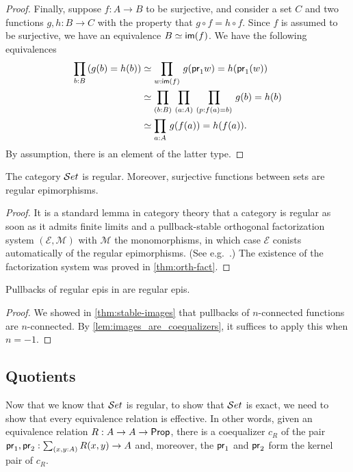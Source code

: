 \begin{proof}
Finally, suppose $f:A\to B$ to be surjective, and consider a set $C$ and two functions
$g,h:B\to C$ with the property that $g\circ f = h\circ f$. Since $f$ 
is assumed to be surjective,
we have an equivalence $B\simeq\mathsf{im}(f)$. We have the following equivalences
\begin{align*}
\prd{b:B} (g(b)= h(b))
& \simeq \prd{w:\im(f)} g(\proj1 w)= h(\proj1(w))\\
& \simeq \prd{b:B}{a:A}{p:f(a)= b} g(b)= h(b)\\
& \simeq \prd{a:A} g(f(a))= h(f(a)).
\end{align*}
By assumption, there is an element of the latter type.
\end{proof}


\begin{thm}\label{thm:set_regular}\label{lem:images_are_coequalizers}
The category $\mathcal{S}et$ is regular. Moreover, surjective functions between sets are regular epimorphisms.
\end{thm}

\begin{proof}
It is a standard lemma in category theory that a category is regular as soon as it admits finite limits and a pullback-stable orthogonal 
factorization system $(\mathcal{E},\mathcal{M})$ with $\mathcal{M}$ the monomorphisms, in which case $\mathcal{E}$ conists automatically of 
the regular epimorphisms.
(See e.g.~\cite[A1.3.4]{elephant}.)
The existence of the factorization system was proved in \autoref{thm:orth-fact}.
\end{proof}

\begin{lem}\label{lem:pb_of_coeq_is_coeq}
Pullbacks of regular epis in \uset are regular epis.
\end{lem}
\begin{proof}
  We showed in \autoref{thm:stable-images} that pullbacks of $n$-connected functions are $n$-connected.
  By \autoref{lem:images_are_coequalizers}, it suffices to apply this when $n=-1$.
\end{proof}

\subsection{Quotients}\label{subsec:quotients}
Now that we know that $\mathcal{S}et$ is regular, to show that $\mathcal{S}et$ is exact, we need to show that every
equivalence relation is effective. In other words, given an equivalence
relation $R:A\to A\to\mathsf{Prop}$, there is a coequalizer $c_R$ of the pair
$\proj1,\proj2:\sm{x,y:A} R(x,y)\to A$ and, moreover, the $\mathsf{pr}_{1}$ and $\mathsf{pr}_{2}$
form the kernel pair of $c_R$.

